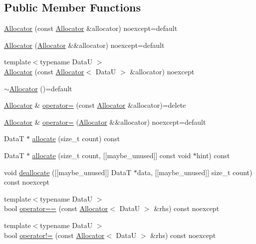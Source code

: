 \subsection*{Public Member Functions}
\begin{DoxyCompactItemize}
\item 
\hyperlink{structmage_1_1_memory_arena_1_1_allocator_ac7d640d69207604612c29ebc60ec6648}{Allocator} (const \hyperlink{structmage_1_1_memory_arena_1_1_allocator}{Allocator} \&allocator) noexcept=default
\item 
\hyperlink{structmage_1_1_memory_arena_1_1_allocator_a54ddc035b0987d71776c54a1240be18d}{Allocator} (\hyperlink{structmage_1_1_memory_arena_1_1_allocator}{Allocator} \&\&allocator) noexcept=default
\item 
{\footnotesize template$<$typename DataU $>$ }\\\hyperlink{structmage_1_1_memory_arena_1_1_allocator_a9485ec7437c3c798a37c67631aa7e8ab}{Allocator} (const \hyperlink{structmage_1_1_memory_arena_1_1_allocator}{Allocator}$<$ DataU $>$ \&allocator) noexcept
\item 
\hyperlink{structmage_1_1_memory_arena_1_1_allocator_a3324ead39d8cdfb8a119425879101e0a}{$\sim$\+Allocator} ()=default
\item 
\hyperlink{structmage_1_1_memory_arena_1_1_allocator}{Allocator} \& \hyperlink{structmage_1_1_memory_arena_1_1_allocator_a9774e6cb2e1f8ac94ee9f6a7be4f561a}{operator=} (const \hyperlink{structmage_1_1_memory_arena_1_1_allocator}{Allocator} \&allocator)=delete
\item 
\hyperlink{structmage_1_1_memory_arena_1_1_allocator}{Allocator} \& \hyperlink{structmage_1_1_memory_arena_1_1_allocator_a3b57cb5e78f00b8d024a042cbfae679d}{operator=} (\hyperlink{structmage_1_1_memory_arena_1_1_allocator}{Allocator} \&\&allocator) noexcept=default
\item 
DataT $\ast$ \hyperlink{structmage_1_1_memory_arena_1_1_allocator_a46d428590d87f47742abc173858ccc95}{allocate} (size\+\_\+t count) const
\item 
DataT $\ast$ \hyperlink{structmage_1_1_memory_arena_1_1_allocator_a699a98f902dddd5ad2b8477b8ed5f77b}{allocate} (size\+\_\+t count, \mbox{[}\mbox{[}maybe\+\_\+unused\mbox{]}\mbox{]} const void $\ast$hint) const
\item 
void \hyperlink{structmage_1_1_memory_arena_1_1_allocator_ab70a70d270ef6e2e1214ad26d660064a}{deallocate} (\mbox{[}\mbox{[}maybe\+\_\+unused\mbox{]}\mbox{]} DataT $\ast$data, \mbox{[}\mbox{[}maybe\+\_\+unused\mbox{]}\mbox{]} size\+\_\+t count) const noexcept
\item 
{\footnotesize template$<$typename DataU $>$ }\\bool \hyperlink{structmage_1_1_memory_arena_1_1_allocator_a7f7971d1bd4522ef847d30d1c5cf3666}{operator==} (const \hyperlink{structmage_1_1_memory_arena_1_1_allocator}{Allocator}$<$ DataU $>$ \&rhs) const noexcept
\item 
{\footnotesize template$<$typename DataU $>$ }\\bool \hyperlink{structmage_1_1_memory_arena_1_1_allocator_a3b20e43f85adbbd070f4dc6f3dca6eb1}{operator!=} (const \hyperlink{structmage_1_1_memory_arena_1_1_allocator}{Allocator}$<$ DataU $>$ \&rhs) const noexcept
\end{DoxyCompactItemize}
